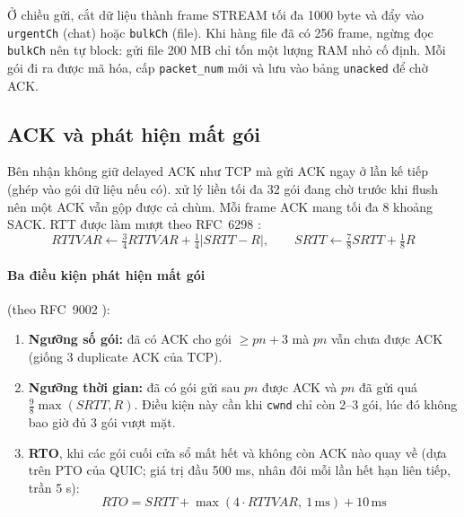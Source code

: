 Ở chiều gửi,  cắt dữ liệu thành frame STREAM tối đa 1000 byte và đẩy vào \texttt{urgentCh} (chat)
hoặc \texttt{bulkCh} (file). Khi hàng file đã có 256 frame,  ngừng đọc \texttt{bulkCh} nên
 tự block: gửi file 200 MB chỉ tốn một lượng RAM nhỏ cố định. Mỗi gói đi ra được mã hóa, cấp
\texttt{packet\_num} mới và lưu vào bảng \texttt{unacked} để chờ ACK.

\subsection{ACK và phát hiện mất gói}
\label{subsec:mat-goi}

Bên nhận không giữ delayed ACK như TCP mà gửi ACK ngay ở lần  kế tiếp (ghép vào gói dữ liệu nếu
có).  xử lý liền tối đa 32 gói đang chờ trước khi flush nên một ACK vẫn gộp được cả chùm. Mỗi frame
ACK mang tối đa 8 khoảng SACK. RTT được làm mượt theo RFC~6298 \cite{rfc6298}:
\begin{equation}
  \mathit{RTTVAR} \leftarrow \tfrac34 \mathit{RTTVAR} + \tfrac14 \lvert \mathit{SRTT} - R \rvert, \qquad
  \mathit{SRTT} \leftarrow \tfrac78 \mathit{SRTT} + \tfrac18 R
\end{equation}

\paragraph{Ba điều kiện phát hiện mất gói} (theo RFC~9002 \cite{rfc9002}):
\begin{enumerate}
  \item \textbf{Ngưỡng số gói:} đã có ACK cho gói $\ge pn+3$ mà $pn$ vẫn chưa được ACK (giống 3 duplicate ACK
        của TCP).
  \item \textbf{Ngưỡng thời gian:} đã có gói gửi sau $pn$ được ACK và $pn$ đã gửi quá $\tfrac98
        \max(\mathit{SRTT}, R)$. Điều kiện này cần khi \texttt{cwnd} chỉ còn 2--3 gói, lúc đó không bao giờ đủ 3 gói
        vượt mặt.
  \item \textbf{RTO}, khi các gói cuối cửa sổ mất hết và không còn ACK nào quay về (dựa trên PTO của QUIC; giá
        trị đầu 500 ms, nhân đôi mỗi lần hết hạn liên tiếp, trần 5 s):
        \begin{equation}
          \mathit{RTO} = \mathit{SRTT} + \max(4\cdot\mathit{RTTVAR},\ 1\,\text{ms}) + 10\,\text{ms}
          \label{eq:rto}
        \end{equation}
\end{enumerate}

